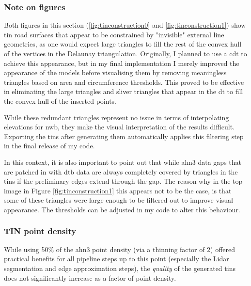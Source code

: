 \subsubsection{Note on figures}

Both figures in this section (\ref{fig:tinconstruction0} and \ref{fig:tinconstruction1}) show \ac{tin} road surfaces that appear to be constrained by "invisible" external line geometries, as one would expect large triangles to fill the rest of the convex hull of the vertices in the Delaunay triangulation. Originally, I planned to use a \ac{cdt} to achieve this appearance, but in my final implementation I merely improved the appearance of the models before visualising them by removing meaningless triangles based on area and circumference thresholds. This proved to be effective in eliminating the large triangles and sliver triangles that appear in the \ac{dt} to fill the convex hull of the inserted points.

While these redundant triangles represent no issue in terms of interpolating elevations for \ac{nwb}, they make the visual interpretation of the results difficult. Exporting the \ac{tin}s after generating them automatically applies this filtering step in the final release of my code.

In this context, it is also important to point out that while \ac{ahn3} data gaps that are patched in with \ac{dtb} data are always completely covered by triangles in the \ac{tin}s if the preliminary edges extend through the gap. The reason why in the top image in Figure \ref{fig:tinconstruction1} this appears not to be the case, is that some of these triangles were large enough to be filtered out to improve visual appearance. The thresholds can be adjusted in my code to alter this behaviour.

\subsubsection{TIN point density}

While using 50\% of the \ac{ahn3} point density (via a thinning factor of 2) offered practical benefits for all pipeline steps up to this point (especially the Lidar segmentation and edge approximation steps), the \textit{quality} of the generated \ac{tin}s does not significantly increase as a factor of point density.

